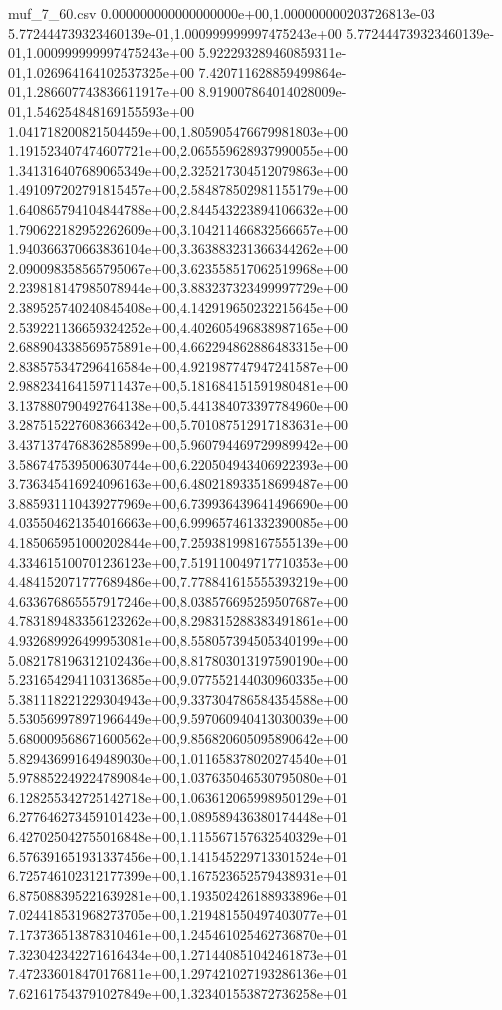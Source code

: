 \begin{filecontents*}{muf_7_60.csv}
0.000000000000000000e+00,1.000000000203726813e-03
5.772444739323460139e-01,1.000999999997475243e+00
5.772444739323460139e-01,1.000999999997475243e+00
5.922293289460859311e-01,1.026964164102537325e+00
7.420711628859499864e-01,1.286607743836611917e+00
8.919007864014028009e-01,1.546254848169155593e+00
1.041718200821504459e+00,1.805905476679981803e+00
1.191523407474607721e+00,2.065559628937990055e+00
1.341316407689065349e+00,2.325217304512079863e+00
1.491097202791815457e+00,2.584878502981155179e+00
1.640865794104844788e+00,2.844543223894106632e+00
1.790622182952262609e+00,3.104211466832566657e+00
1.940366370663836104e+00,3.363883231366344262e+00
2.090098358565795067e+00,3.623558517062519968e+00
2.239818147985078944e+00,3.883237323499997729e+00
2.389525740240845408e+00,4.142919650232215645e+00
2.539221136659324252e+00,4.402605496838987165e+00
2.688904338569575891e+00,4.662294862886483315e+00
2.838575347296416584e+00,4.921987747947241587e+00
2.988234164159711437e+00,5.181684151591980481e+00
3.137880790492764138e+00,5.441384073397784960e+00
3.287515227608366342e+00,5.701087512917183631e+00
3.437137476836285899e+00,5.960794469729989942e+00
3.586747539500630744e+00,6.220504943406922393e+00
3.736345416924096163e+00,6.480218933518699487e+00
3.885931110439277969e+00,6.739936439641496690e+00
4.035504621354016663e+00,6.999657461332390085e+00
4.185065951000202844e+00,7.259381998167555139e+00
4.334615100701236123e+00,7.519110049717710353e+00
4.484152071777689486e+00,7.778841615555393219e+00
4.633676865557917246e+00,8.038576695259507687e+00
4.783189483356123262e+00,8.298315288383491861e+00
4.932689926499953081e+00,8.558057394505340199e+00
5.082178196312102436e+00,8.817803013197590190e+00
5.231654294110313685e+00,9.077552144030960335e+00
5.381118221229304943e+00,9.337304786584354588e+00
5.530569978971966449e+00,9.597060940413030039e+00
5.680009568671600562e+00,9.856820605095890642e+00
5.829436991649489030e+00,1.011658378020274540e+01
5.978852249224789084e+00,1.037635046530795080e+01
6.128255342725142718e+00,1.063612065998950129e+01
6.277646273459101423e+00,1.089589436380174448e+01
6.427025042755016848e+00,1.115567157632540329e+01
6.576391651931337456e+00,1.141545229713301524e+01
6.725746102312177399e+00,1.167523652579438931e+01
6.875088395221639281e+00,1.193502426188933896e+01
7.024418531968273705e+00,1.219481550497403077e+01
7.173736513878310461e+00,1.245461025462736870e+01
7.323042342271616434e+00,1.271440851042461873e+01
7.472336018470176811e+00,1.297421027193286136e+01
7.621617543791027849e+00,1.323401553872736258e+01

\end{filecontents*}
